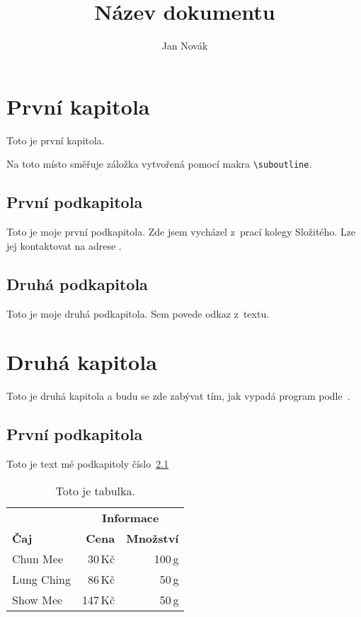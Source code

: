 \documentclass[11pt]{article}
\title{Název dokumentu}
\author{Jan Novák}
\begin{document}
\maketitle
\tableofcontents{}

\section{První kapitola}
Toto je první kapitola.

\medskip
{}
Na toto místo směřuje záložka vytvořená pomocí makra \verb|\suboutline|.

\subsection{První podkapitola}
Toto je moje první podkapitola.
Zde jsem vycházel z~prací kolegy Složitého. Lze jej kontaktovat 
na adrese .


\subsection{Druhá podkapitola}
Toto je moje druhá podkapitola. Sem povede odkaz z~textu.


\section{Druhá kapitola}
Toto je druhá kapitola a budu se zde zabývat tím, jak vypadá
program podle~\cite{smith}.

\subsection{První podkapitola}\label{kapX}
Toto je text mé podkapitoly číslo~\ref{kapX}
\begin{table}[ht]
  \begin{center}
    \renewcommand{\arraystretch}{1.2}
    \begin{tabular}{||l|rr||}
      \hline
      & \multicolumn{2}{|c||}{\bf \hbox{Informace}} \\
      \cline{2-3}
      \bf Čaj & \bf Cena & \bf Množství \\
      \hline
      Chun Mee & 30\,Kč & 100\,g \\
      Lung Ching & 86\,Kč & 50\,g \\
      Show Mee & 147\,Kč & 50\,g \\
      \hline
    \end{tabular}
    \caption{Toto je tabulka.} \label{tab}
  \end{center}
\end{table}
\end{document}
